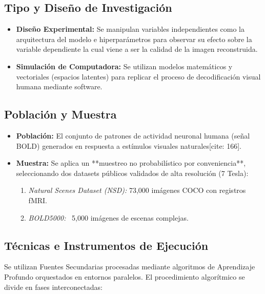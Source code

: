 \documentclass{article}
\begin{document}
\subsection{Tipo y Diseño de Investigación}
\begin{itemize}
    \item \textbf{Diseño Experimental:} Se manipulan variables independientes como la arquitectura del modelo e hiperparámetros para observar su efecto sobre la variable dependiente la cual viene a ser la calidad de la imagen reconstruida.
    \item \textbf{Simulación de Computadora:} Se utilizan modelos matemáticos y vectoriales (espacios latentes) para replicar el proceso de decodificación visual humana mediante software.
\end{itemize}

\subsection{Población y Muestra}
\begin{itemize}
    \item \textbf{Población:} El conjunto de patrones de actividad neuronal humana (señal BOLD) generados en respuesta a estímulos visuales naturales[cite: 166].
    \item \textbf{Muestra:} Se aplica un **muestreo no probabilístico por conveniencia**, seleccionando dos datasets públicos validados de alta resolución (7 Tesla):
    \begin{enumerate}
        \item \textit{Natural Scenes Dataset (NSD):} 73,000 imágenes COCO con registros fMRI.
        \item \textit{BOLD5000:} ~5,000 imágenes de escenas complejas.
    \end{enumerate}
\end{itemize}

\subsection{Técnicas e Instrumentos de Ejecución}
Se utilizan Fuentes Secundarias procesadas mediante algoritmos de Aprendizaje Profundo orquestados en entornos paralelos. El procedimiento algorítmico se divide en fases interconectadas:
\end{document}
